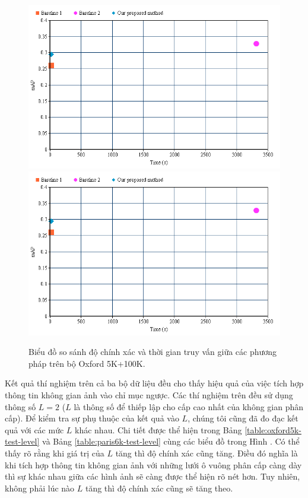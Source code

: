 \begin{figure}[!htbp]
  \begin{center}
    \leavevmode
    \ifpdf
      \includegraphics[scale=0.5]{1_chart}
    \else
      \includegraphics[scale=0.5]{1_chart}
    \fi
    \caption[Biểu đồ so sánh độ chính xác và thời gian truy vấn giữa các phương pháp]{Biểu đồ so sánh độ chính xác và thời gian truy vấn giữa các phương pháp trên bộ Oxford 5K+100K.}
    \label{Fig1Chart}
  \end{center}
\end{figure}

Kết quả thí nghiệm trên cả ba bộ dữ liệu đều cho thấy hiệu quả của việc tích hợp thông tin không gian ảnh vào chỉ mục ngược. Các thí nghiệm trên đều sử dụng thông số $L = 2$ ($L$ là thông số để thiếp lập cho cấp cao nhất của không gian phân cấp). Để kiểm tra sự phụ thuộc của kết quả vào $L$, chúng tôi cũng đã đo đạc kết quả với các mức $L$ khác nhau. Chi tiết được thể hiện trong Bảng \ref{table:oxford5k-test-level} và Bảng \ref{table:paris6k-test-level} cùng các biểu đồ trong Hình . Có thể thấy rõ rằng khi giá trị của $L$ tăng thì độ chính xác cũng tăng. Điều đó nghĩa là khi tích hợp thông tin không gian ảnh với những lưới ô vuông phân cấp càng dày thì sự khác nhau giữa các hình ảnh sẽ càng được thể hiện rõ nét hơn. Tuy nhiên, không phải lúc nào $L$ tăng thì độ chính xác cũng sẽ tăng theo.

